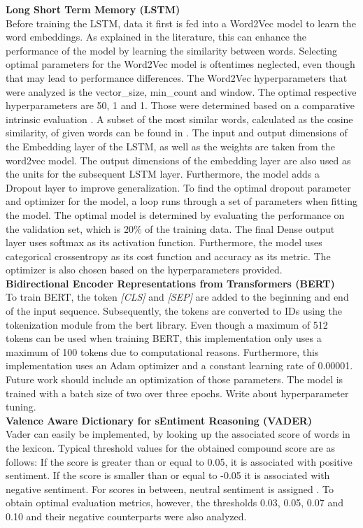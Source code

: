 \documentclass[11pt, a4paper]{article}
\begin{document}
\noindent\textbf{Long Short Term Memory (LSTM)}\\
Before training the LSTM, data it first is fed into a Word2Vec model to learn the word embeddings. As explained in the literature, this can enhance the performance of the model by learning the similarity between words.
Selecting optimal parameters for the Word2Vec model is oftentimes neglected, even though that may lead to performance differences.
The Word2Vec hyperparameters that were analyzed is the vector\_size, min\_count and window. The optimal respective hyperparameters are 50, 1 and 1. Those were determined based on a comparative intrinsic evaluation \citep{schnabel2015embeddings}.
A subset of the most similar words, calculated as the cosine similarity, of given words can be found in .
The input and output dimensions of the Embedding layer of the LSTM, as well as the weights are taken from the word2vec model.
The output dimensions of the embedding layer are also used as the units for the subsequent LSTM layer. Furthermore, the model adds a Dropout layer to improve generalization. To find the optimal dropout parameter and optimizer for the model,
a loop runs through a set of parameters when fitting the model. The optimal model is determined by evaluating the performance on the validation set, which is 20\% of the training data. 
The final Dense output layer uses softmax as its activation function. Furthermore, the model uses categorical crossentropy as its cost function and accuracy as its metric. The optimizer is also chosen based on the hyperparameters provided.\\

\noindent\textbf{Bidirectional Encoder Representations from Transformers (BERT)}\\
To train BERT, the token \emph{[CLS]} and \emph{[SEP]} are added to the beginning and end of the input sequence. Subsequently, the tokens are converted to IDs using the tokenization
module from the bert library. Even though a maximum of 512 tokens can be used when training BERT, this implementation only uses a maximum of 100 tokens due to computational reasons.
Furthermore, this implementation uses an Adam optimizer and a constant learning rate of 0.00001. Future work should include an optimization of those parameters. The model is trained with
a batch size of two over three epochs. Write about hyperparameter tuning.\\

\noindent\textbf{Valence Aware Dictionary for sEntiment Reasoning (VADER)}\\
Vader can easily be implemented, by looking up the associated score of words in the lexicon. Typical threshold values for the obtained compound score are as follows: 
If the score is greater than or equal to 0.05, it is associated with positive sentiment. If the score is smaller than or equal to -0.05 it is associated with negative sentiment. For scores
in between, neutral sentiment is assigned \citep{hutto2015vader}. To obtain optimal evaluation metrics, however, the thresholds 0.03, 0.05, 0.07 and 0.10 and their negative counterparts were
also analyzed.
\end{document}
